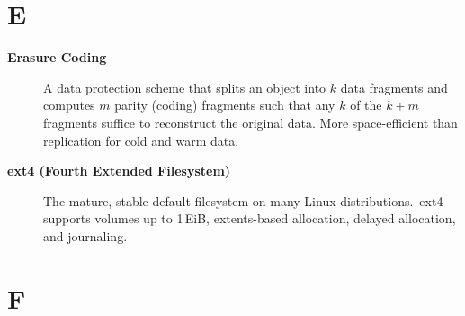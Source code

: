 \section*{E}

\begin{description}

\item[\textbf{Erasure Coding}]
A data protection scheme that splits an object into $k$ data fragments and
computes $m$ parity (coding) fragments such that any $k$ of the $k+m$
fragments suffice to reconstruct the original data. More space-efficient
than replication for cold and warm data.

\item[\textbf{ext4 (Fourth Extended Filesystem)}]
The mature, stable default filesystem on many Linux distributions.\ ext4
supports volumes up to 1\,EiB, extents-based allocation, delayed
allocation, and journaling.

\end{description}

\section*{F}

